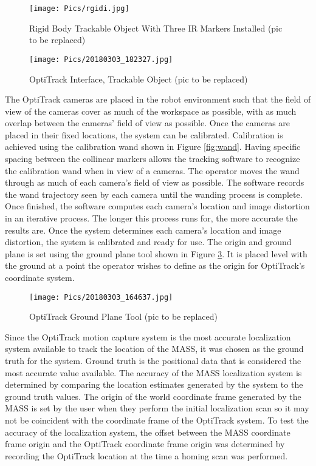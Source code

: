 \begin{figure}
    \centering
    \texttt{[image: Pics/rgidi.jpg]}
    \caption{Rigid Body Trackable Object With Three IR Markers Installed (pic to be replaced)}
    \label{fig:trackable}
\end{figure}
\begin{figure}
    \centering
    \texttt{[image: Pics/20180303\_182327.jpg]}
    \caption{OptiTrack Interface, Trackable Object (pic to be replaced)}
    \label{fig:motivetrackable}
\end{figure}

The OptiTrack cameras are placed in the robot environment such that the field of view of the cameras cover as much of the workspace as possible, with as much overlap between the cameras' field of view as possible. Once the cameras are placed in their fixed locations, the system can be calibrated. Calibration is achieved using the calibration wand shown in Figure \ref{fig:wand}. Having specific spacing between the collinear markers allows the tracking software to recognize the calibration wand when in view of a cameras. The operator moves the wand through as much of each camera's field of view as possible. The software records the wand trajectory seen by each camera until the wanding process is complete. Once finished, the software computes each camera's location and image distortion in an iterative process. The longer this process runs for, the more accurate the results are. Once the system determines each camera's location and image distortion, the system is calibrated and ready for use. The origin and ground plane is set using the ground plane tool shown in Figure \ref{fig:groundplane}. It is placed level with the ground at a point the operator wishes to define as the origin for OptiTrack's coordinate system.\\

\begin{figure}
    \centering
    \texttt{[image: Pics/20180303\_164637.jpg]}
    \caption{OptiTrack Ground Plane Tool (pic to be replaced)}
    \label{fig:groundplane}
\end{figure}

Since the OptiTrack motion capture system is the most accurate localization system available to track the location of the MASS, it was chosen as the ground truth for the system. Ground truth is the positional data that is considered the most accurate value available. The accuracy of the MASS localization system is determined by comparing the location estimates generated by the system to the ground truth values. The origin of the world coordinate frame generated by the MASS is set by the user when they perform the initial localization scan so it may not be coincident with the coordinate frame of the OptiTrack system. To test the accuracy of the localization system, the offset between the MASS coordinate frame origin and the OptiTrack coordinate frame origin was determined by recording the OptiTrack location at the time a homing scan was performed.\\

